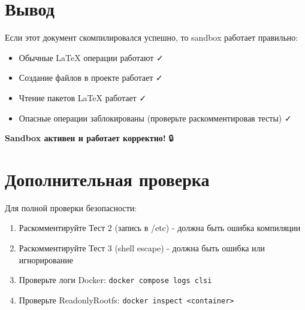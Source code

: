 \documentclass{article}
\begin{document}
\section{Вывод}

Если этот документ скомпилировался успешно, то sandbox работает правильно:

\begin{itemize}
    \item Обычные LaTeX операции работают ✓
    \item Создание файлов в проекте работает ✓
    \item Чтение пакетов LaTeX работает ✓
    \item Опасные операции заблокированы (проверьте раскомментировав тесты) ✓
\end{itemize}

\vspace{1em}
\textbf{Sandbox активен и работает корректно!} 🔒

\section{Дополнительная проверка}

Для полной проверки безопасности:

\begin{enumerate}
    \item Раскомментируйте Тест 2 (запись в /etc) - должна быть ошибка компиляции
    \item Раскомментируйте Тест 3 (shell escape) - должна быть ошибка или игнорирование
    \item Проверьте логи Docker: \texttt{docker compose logs clsi}
    \item Проверьте ReadonlyRootfs: \texttt{docker inspect <container>}
\end{enumerate}
\end{document}
